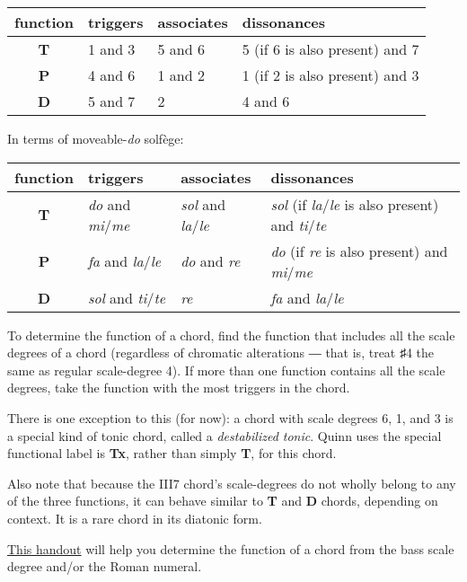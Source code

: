 \documentclass{book}
\begin{document}
\begin{longtable}[]{@{}clll@{}}
\toprule
function & triggers & associates & dissonances \\
\midrule
\endhead
\textbf{T} & 1 and 3 & 5 and 6 & 5 (if 6 is also present) and 7 \\
\textbf{P} & 4 and 6 & 1 and 2 & 1 (if 2 is also present) and 3 \\
\textbf{D} & 5 and 7 & 2 & 4 and 6 \\
\bottomrule
\end{longtable}

In terms of moveable-\emph{do} solfège:

\begin{longtable}[]{@{}clll@{}}
\toprule
function & triggers & associates & dissonances \\
\midrule
\endhead
\textbf{T} & \emph{do} and \emph{mi}/\emph{me} & \emph{sol} and
\emph{la}/\emph{le} & \emph{sol} (if \emph{la}/\emph{le} is also present) and
\emph{ti}/\emph{te} \\
\textbf{P} & \emph{fa} and \emph{la}/\emph{le} & \emph{do} and \emph{re} &
\emph{do} (if \emph{re} is also present) and \emph{mi}/\emph{me} \\
\textbf{D} & \emph{sol} and \emph{ti}/\emph{te} & \emph{re} & \emph{fa} and
\emph{la}/\emph{le} \\
\bottomrule
\end{longtable}

To determine the function of a chord, find the function that includes all the
scale degrees of a chord (regardless of chromatic alterations ― that is, treat
♯4 the same as regular scale-degree 4). If more than one function contains all
the scale degrees, take the function with the most triggers in the chord.

There is one exception to this (for now): a chord with scale degrees 6, 1, and
3 is a special kind of tonic chord, called a \emph{destabilized tonic}. Quinn
uses the special functional label is \textbf{Tx}, rather than simply
\textbf{T}, for this chord.

Also note that because the III7 chord's scale-degrees do not wholly belong to
any of the three functions, it can behave similar to \textbf{T} and \textbf{D}
chords, depending on context. It is a rare chord in its diatonic form.

\href{/images/Handouts/HarmoniesByBassScaleDegree.pdf}{This handout} will help
you determine the function of a chord from the bass scale degree and/or the
Roman numeral.
\end{document}
